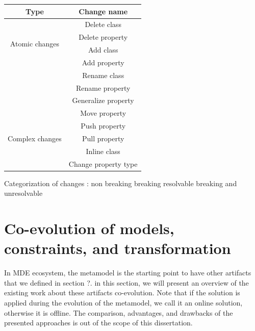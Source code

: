  \vspace{1em}
 	\begin{tabular}{ |c|c| } 
 		\hline
 		Type  & Change name \\
 		\hline
 		\multirow{4}{4em}{ Atomic changes} & Delete class  \\ 
 		& Delete property \\ 
 		& Add class \\ 
 		& Add property \\ 
 		& Rename class \\ 
 		& Rename property \\ 
 		& Generalize property \\ 
 		\hline
 		\hline
 		\multirow{5}{4em}{Complex changes} & Move property \\ 
 		& Push property  \\ 
 		& Pull property\\ 
 		& Inline class\\
 		& Change property type\\
 		\hline
 		
 	\end{tabular}
 	  
 	\vspace{1em}
 	
 	Categorization of changes : 
 	non breaking
 	breaking resolvable
 	breaking and unresolvable
 	
 \section{Co-evolution of models, constraints, and transformation}
 In MDE ecosystem, the metamodel is the starting point to have other artifacts that we defined in section ?. in this section, we will present an overview of the existing work about these artifacts co-evolution. Note that if the solution is applied during the evolution of the metamodel, we call it an online solution, otherwise it is offline.
 The comparison, advantages, and drawbacks of the presented approaches is out of the scope of this dissertation.
 
